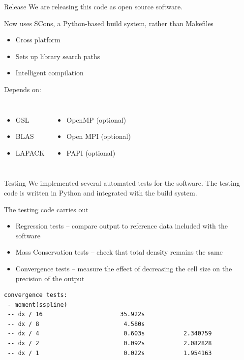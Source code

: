 \documentclass{beamer}
\begin{document}
    \begin{frame}{Release}
        We are releasing this code as open source software.

        \vfill

        Now uses SCons, a Python-based build system, rather than Makefiles
        \begin{itemize}
            \item Cross platform
            \item Sets up library search paths
            \item Intelligent compilation
        \end{itemize}

        \vfill

        Depends on:
        \begin{columns}
            \begin{itemize}
                \item GSL
                \item BLAS
                \item LAPACK
            \end{itemize}
            \begin{itemize}
                \item OpenMP (optional)
                \item Open MPI (optional)
                \item PAPI (optional)
            \end{itemize}
        \end{columns}
    \end{frame}

    \begin{frame}[fragile=singleslide]{Testing}
        We implemented several automated tests for the software.
        The testing code is written in Python and integrated with the build system.

        \vfill

        The testing code carries out
        \begin{itemize}
            \item Regression tests -- compare output to reference data included with the software
            \item Mass Conservation tests -- check that total density remains the same
            \item Convergence tests -- measure the effect of decreasing the cell size on the precision of the output
        \end{itemize}

        \vfill

        \begin{verbatim}
convergence tests:
 - moment(sspline)
 -- dx / 16                      35.922s
 -- dx / 8                        4.580s
 -- dx / 4                        0.603s           2.340759
 -- dx / 2                        0.092s           2.082828
 -- dx / 1                        0.022s           1.954163
        \end{verbatim}
    \end{frame}
\end{document}

